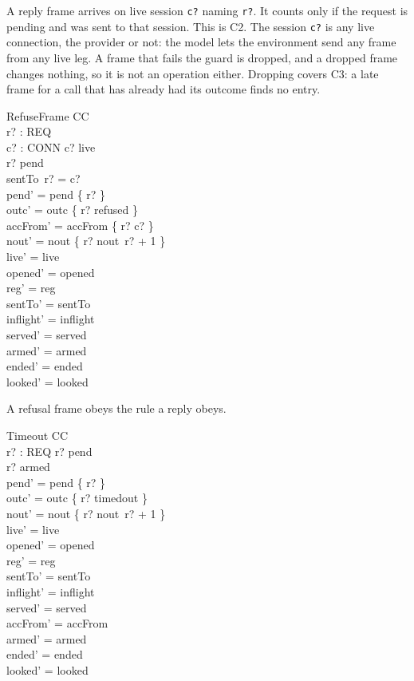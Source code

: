 \documentclass[a4paper,10pt,fleqn]{article}
\begin{document}
A reply frame arrives on live session \texttt{c?} naming \texttt{r?}.  It
counts only if the request is pending and was sent to that session.  This
is C2.  The session \texttt{c?} is any live connection, the provider or not:
the model lets the environment send any frame from any live leg.  A frame
that fails the guard is dropped, and a dropped frame changes nothing, so it
is not an operation either.  Dropping covers C3: a late frame for a call
that has already had its outcome finds no entry.

\begin{schema}{RefuseFrame}
  \Delta CC \\
  r? : REQ \\
  c? : CONN
\where
  c? \in live \\
  r? \in pend \\
  sentTo~r? = c? \\
  pend' = pend \setminus \{ r? \} \\
  outc' = outc \oplus \{ r? \mapsto refused \} \\
  accFrom' = accFrom \oplus \{ r? \mapsto c? \} \\
  nout' = nout \oplus \{ r? \mapsto nout~r? + 1 \} \\
  live' = live \\
  opened' = opened \\
  reg' = reg \\
  sentTo' = sentTo \\
  inflight' = inflight \\
  served' = served \\
  armed' = armed \\
  ended' = ended \\
  looked' = looked
\end{schema}

A refusal frame obeys the rule a reply obeys.

\begin{schema}{Timeout}
  \Delta CC \\
  r? : REQ
\where
  r? \in pend \\
  r? \in armed \\
  pend' = pend \setminus \{ r? \} \\
  outc' = outc \oplus \{ r? \mapsto timedout \} \\
  nout' = nout \oplus \{ r? \mapsto nout~r? + 1 \} \\
  live' = live \\
  opened' = opened \\
  reg' = reg \\
  sentTo' = sentTo \\
  inflight' = inflight \\
  served' = served \\
  accFrom' = accFrom \\
  armed' = armed \\
  ended' = ended \\
  looked' = looked
\end{schema}
\end{document}
